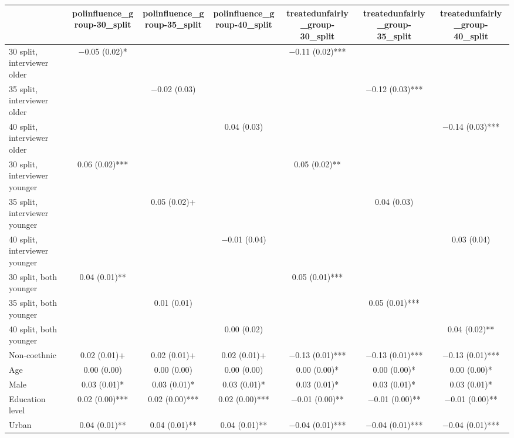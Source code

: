 \begin{table}[H]
\centering
\fontsize{7}{9}\selectfont
\begin{tabular}[t]{lcccccc}
\toprule
  & polinfluence\_group-30\_split & polinfluence\_group-35\_split & polinfluence\_group-40\_split & treatedunfairly\_group-30\_split & treatedunfairly\_group-35\_split & treatedunfairly\_group-40\_split\\
\midrule
30 split, interviewer older & \num{-0.05} (\num{0.02})* &  &  & \num{-0.11} (\num{0.02})*** &  & \\
35 split, interviewer older &  & \num{-0.02} (\num{0.03}) &  &  & \num{-0.12} (\num{0.03})*** & \\
40 split, interviewer older &  &  & \num{0.04} (\num{0.03}) &  &  & \num{-0.14} (\num{0.03})***\\
30 split, interviewer younger & \num{0.06} (\num{0.02})*** &  &  & \num{0.05} (\num{0.02})** &  & \\
35 split, interviewer younger &  & \num{0.05} (\num{0.02})+ &  &  & \num{0.04} (\num{0.03}) & \\
40 split, interviewer younger &  &  & \num{-0.01} (\num{0.04}) &  &  & \num{0.03} (\num{0.04})\\
30 split, both younger & \num{0.04} (\num{0.01})** &  &  & \num{0.05} (\num{0.01})*** &  & \\
35 split, both younger &  & \num{0.01} (\num{0.01}) &  &  & \num{0.05} (\num{0.01})*** & \\
40 split, both younger &  &  & \num{0.00} (\num{0.02}) &  &  & \num{0.04} (\num{0.02})**\\
Non-coethnic & \num{0.02} (\num{0.01})+ & \num{0.02} (\num{0.01})+ & \num{0.02} (\num{0.01})+ & \num{-0.13} (\num{0.01})*** & \num{-0.13} (\num{0.01})*** & \num{-0.13} (\num{0.01})***\\
Age & \num{0.00} (\num{0.00}) & \num{0.00} (\num{0.00}) & \num{0.00} (\num{0.00}) & \num{0.00} (\num{0.00})* & \num{0.00} (\num{0.00})* & \num{0.00} (\num{0.00})*\\
Male & \num{0.03} (\num{0.01})* & \num{0.03} (\num{0.01})* & \num{0.03} (\num{0.01})* & \num{0.03} (\num{0.01})* & \num{0.03} (\num{0.01})* & \num{0.03} (\num{0.01})*\\
Education level & \num{0.02} (\num{0.00})*** & \num{0.02} (\num{0.00})*** & \num{0.02} (\num{0.00})*** & \num{-0.01} (\num{0.00})** & \num{-0.01} (\num{0.00})** & \num{-0.01} (\num{0.00})**\\
Urban & \num{0.04} (\num{0.01})** & \num{0.04} (\num{0.01})** & \num{0.04} (\num{0.01})** & \num{-0.04} (\num{0.01})*** & \num{-0.04} (\num{0.01})*** & \num{-0.04} (\num{0.01})***\\

\end{tabular}
\end{table}
